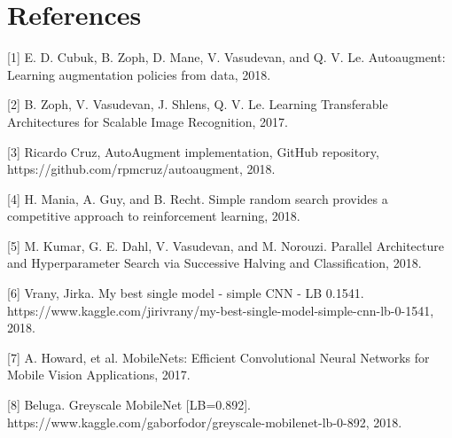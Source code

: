 \documentclass[10pt,twocolumn,letterpaper]{article}
\begin{document}
\section{References}

{\small



[1] E. D. Cubuk, B. Zoph, D. Mane, V. Vasudevan, and Q. V. Le. Autoaugment:   Learning  augmentation  policies  from  data, 2018. \newline

[2] B. Zoph, V. Vasudevan, J. Shlens, Q. V. Le. Learning Transferable Architectures for Scalable Image Recognition, 2017. \newline

[3] Ricardo Cruz, AutoAugment implementation, GitHub repository, https://github.com/rpmcruz/autoaugment, 2018. \newline

[4] H. Mania, A. Guy, and B. Recht. Simple random search provides a competitive approach to reinforcement learning, 2018.\newline

[5] M. Kumar, G. E. Dahl, V. Vasudevan, and M. Norouzi. Parallel Architecture and Hyperparameter Search
via Successive Halving and Classification, 2018.\newline

[6] Vrany, Jirka. My best single model - simple CNN - LB 0.1541. https://www.kaggle.com/jirivrany/my-best-single-model-simple-cnn-lb-0-1541, 2018.\newline

[7] A. Howard, et al. MobileNets: Efficient Convolutional Neural Networks for Mobile Vision
Applications, 2017. \newline

[8] Beluga. Greyscale MobileNet [LB=0.892]. https://www.kaggle.com/gaborfodor/greyscale-mobilenet-lb-0-892, 2018.\newline

}
\end{document}
